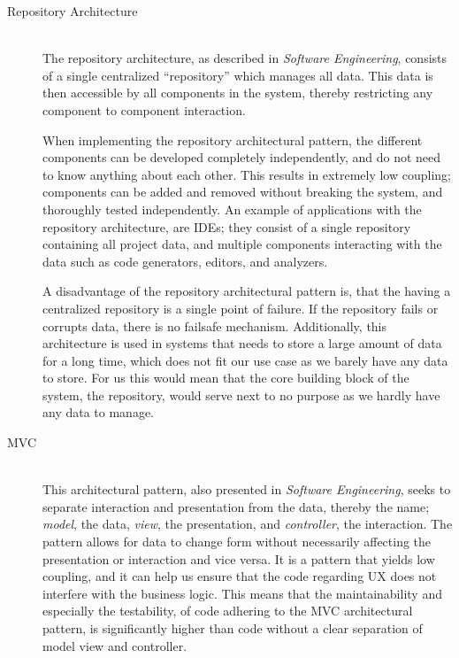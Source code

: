 \begin{description}
    \item[Repository Architecture]\hfill\\
The repository architecture, as described in \textit{Software Engineering}\cite[p. 179-180]{sommerville}, consists of a single centralized \enquote{repository} which manages all data.
This data is then accessible by all components in the system, thereby restricting any component to component interaction.

When implementing the repository architectural pattern, the different components can be developed completely independently, and do not need to know anything about each other.
This results in extremely low coupling; components can be added and removed without breaking the system, and thoroughly tested independently.
An example of applications with the repository architecture, are IDEs; they consist of a single repository containing all project data, and multiple components interacting with the data such as code generators, editors, and analyzers.

A disadvantage of the repository architectural pattern is, that the having a centralized repository is a single point of failure.
If the repository fails or corrupts data, there is no failsafe mechanism.
Additionally, this architecture is used in systems that needs to store a large amount of data for a long time, which does not fit our use case as we barely have any data to store.
For us this would mean that the core building block of the system, the repository, would serve next to no purpose as we hardly have any data to manage.

\item[\acl{MVC}]\hfill\\
This architectural pattern, also presented in \textit{Software Engineering}\cite[p. 176]{sommerville}, seeks to separate interaction and presentation from the data, thereby the name; \textit{model}, the data, \textit{view}, the presentation, and \textit{controller}, the interaction.
The pattern allows for data to change form without necessarily affecting the presentation or interaction and vice versa.
It is a pattern that yields low coupling, and it can help us ensure that the code regarding \ac{UX} does not interfere with the business logic.
This means that the maintainability and especially the testability, of code adhering to the \ac{MVC} architectural pattern, is significantly higher than code without a clear separation of model view and controller.


\end{description}
